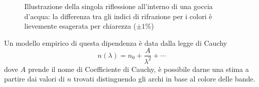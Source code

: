 \documentclass{report}[a4paper,11pt]
\newcommand{\drawarcdelta}[4]{
  \draw ($#1+(#2:#4)$) arc[start angle=#2, delta angle=#3, radius=#4];
}
\newcommand{\drawlabeledarcdelta}[6]{
  \drawarcdelta{#1}{#2}{#3}{#4}
  \node at ($#1+(#2+#3/2:#6)$) {#5};
}
\begin{document}
\begin{figure}[H]
 \caption{Illustrazione della singola riflessione all'interno di una goccia d'acqua: la differenza tra gli indici di rifrazione per i colori è lievemente esagerata per chiarezza ($\pm 1\% $)\label{fig:internal_refl1}}
\end{figure}
Un modello empirico di questa dipendenza è data dalla legge di Cauchy
\begin{equation}\label{eq:Cauchy}
n(\lambda) = n_0 + \frac{A}{\lambda^2}+ \cdots
\end{equation}
dove $A$ prende il nome di Coefficiente di Cauchy, è possibile darne una stima a partire dai valori di $n$ trovati distinguendo gli archi in base al colore delle bande.
\end{document}
